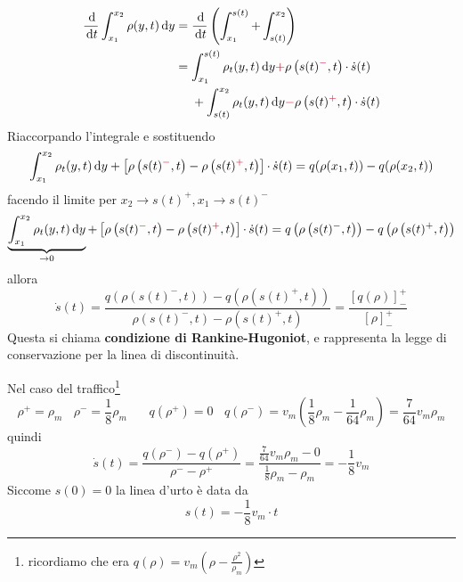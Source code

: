 \documentclass[10pt,a4paper,twoside,openright]{book}
\newcommand{\de}{\,\mathrm d}
\newcommand{\dy}{\de y}
\newcommand{\dt}{\de t}
\begin{document}
\begin{align*}
	\frac{\de}{\dt}\int ^{x_{2}}_{x_{1}} \rho (y,t) \dy & =\frac{\de}{\dt}\left(\int ^{s(t)}_{x_{1}} +\int ^{x_{2}}_{s(t)}\right)                                                                                                  \\
	                                                 & =\int ^{s(t)}_{x_{1}} \rho _{t}(y,t) \dy\textcolor[rgb]{0.82,0.01,0.11}{+} \rho \left(s(t)\textcolor[rgb]{0.82,0.01,0.11}{^{-}} ,t\right) \cdotp \dot{s}(t)         \\
	                                                 & \ \ \ \ +\int ^{x_{2}}_{s(t)} \rho _{t}(y,t) \dy\textcolor[rgb]{0.82,0.01,0.11}{-} \rho \left(s(t)\textcolor[rgb]{0.82,0.01,0.11}{^{+}} ,t\right) \cdotp \dot{s}(t) 
\end{align*}
Riaccorpando l'integrale e sostituendo
\begin{equation*}
	\int ^{x_{2}}_{x_{1}} \rho _{t}(y,t) \dy+\left[ \rho \left(s(t)\textcolor[rgb]{0.82,0.01,0.11}{^{-}} ,t\right) -\rho \left(s(t)\textcolor[rgb]{0.82,0.01,0.11}{^{+}} ,t\right)\right] \cdotp \dot{s}(t) =q(\rho (x_{1} ,t)) -q(\rho (x_{2} ,t))
\end{equation*}
facendo il limite per $x_{2}\rightarrow s(t)^{+} ,x_{1}\rightarrow s(t)^{-}$
\begin{equation*}
	\underbrace{\int ^{x_{2}}_{x_{1}} \rho _{t}(y,t) \dy}_{\rightarrow 0} +\left[ \rho \left(s(t)\textcolor[rgb]{0.82,0.01,0.11}{^{-}} ,t\right) -\rho \left(s(t)\textcolor[rgb]{0.82,0.01,0.11}{^{+}} ,t\right)\right] \cdotp \dot{s}(t) =q\left(\rho \left(s(t)^{-} ,t\right)\right) -q\left(\rho \left(s(t)^{+} ,t\right)\right)
\end{equation*}
allora
\begin{equation}
	\dot{s}(t) =\frac{q\left(\rho \left(s(t)^{-} ,t\right)\right) -q\left(\rho \left(s(t)^{+} ,t\right)\right)}{\rho \left(s(t)^{-} ,t\right) -\rho \left(s(t)^{+} ,t\right)} =\frac{[ q(\rho)]^{+}_{-}}{[ \rho ]^{+}_{-}}
\end{equation}
Questa si chiama \textbf{condizione di Rankine-Hugoniot}, e rappresenta la legge di conservazione per la linea di discontinuità.

Nel caso del traffico\footnote{ricordiamo che era $q(\rho) =v_{m}\left(\rho -\frac{\rho ^{2}}{\rho _{m}}\right)$}
\begin{equation*}
	\rho ^{+} =\rho _{m} \ \ \ \ \rho ^{-} =\frac{1}{8} \rho _{m} \ \ \ \ \ \ \ \ q\left(\rho ^{+}\right) =0\ \ \ \ q\left(\rho ^{-}\right) =v_{m}\left(\frac{1}{8} \rho _{m} -\frac{1}{64} \rho _{m}\right) =\frac{7}{64} v_{m} \rho _{m}
\end{equation*}
quindi
\begin{equation*}
	\dot{s}(t) =\frac{q\left(\rho ^{-}\right) -q\left(\rho ^{+}\right)}{\rho ^{-} -\rho ^{+}} =\frac{\frac{7}{64} v_{m} \rho _{m} -0}{\frac{1}{8} \rho _{m} -\rho _{m}} =-\frac{1}{8} v_{m}
\end{equation*}
Siccome $s(0) =0$ la linea d'urto è data da
\begin{equation*}
	s(t) =-\frac{1}{8} v_{m} \cdotp t
\end{equation*}
\end{document}
